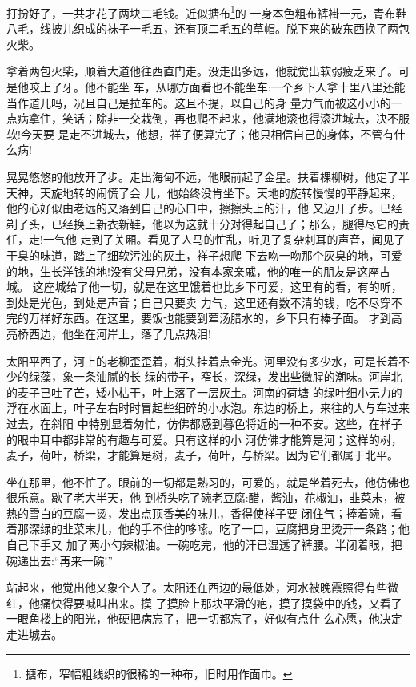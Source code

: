 \documentclass[11pt,a4paper,onecolumn]{article}
\begin{document}
打扮好了，一共才花了两块二毛钱。近似搪布\footnote{搪布，窄幅粗线织的很稀的一种布，旧时用作面巾。}的
一身本色粗布裤褂一元，青布鞋八毛，线披儿织成的袜子一毛五，还有顶二毛五的草帽。脱下来的破东西换了两包
火柴。

拿着两包火柴，顺着大道他往西直门走。没走出多远，他就觉出软弱疲乏来了。可是他咬上了牙。他不能坐
车，从哪方面看也不能坐车:一个乡下人拿十里八里还能当作道儿吗，况且自己是拉车的。这且不提，以自己的身
量力气而被这小小的一点病拿住，笑话；除非一交栽倒，再也爬不起来，他满地滚也得滚进城去，决不服软!今天要
是走不进城去，他想，祥子便算完了；他只相信自己的身体，不管有什么病!

晃晃悠悠的他放开了步。走出海甸不远，他眼前起了金星。扶着棵柳树，他定了半天神，天旋地转的闹慌了会
儿，他始终没肯坐下。天地的旋转慢慢的平静起来，他的心好似由老远的又落到自己的心口中，擦擦头上的汗，他
又迈开了步。已经剃了头，已经换上新衣新鞋，他以为这就十分对得起自己了；那么，腿得尽它的责任，走!一气他
走到了关厢。看见了人马的忙乱，听见了复杂刺耳的声音，闻见了干臭的味道，踏上了细软污浊的灰土，祥子想爬
下去吻一吻那个灰臭的地，可爱的地，生长洋钱的地!没有父母兄弟，没有本家亲戚，他的唯一的朋友是这座古城。
这座城给了他一切，就是在这里饿着也比乡下可爱，这里有的看，有的听，到处是光色，到处是声音；自己只要卖
力气，这里还有数不清的钱，吃不尽穿不完的万样好东西。在这里，要饭也能要到荤汤腊水的，乡下只有棒子面。
才到高亮桥西边，他坐在河岸上，落了几点热泪!

太阳平西了，河上的老柳歪歪着，梢头挂着点金光。河里没有多少水，可是长着不少的绿藻，象一条油腻的长
绿的带子，窄长，深绿，发出些微腥的潮味。河岸北的麦子已吐了芒，矮小枯干，叶上落了一层灰土。河南的荷塘
的绿叶细小无力的浮在水面上，叶子左右时时冒起些细碎的小水泡。东边的桥上，来往的人与车过来过去，在斜阳
中特别显着匆忙，仿佛都感到暮色将近的一种不安。这些，在祥子的眼中耳中都非常的有趣与可爱。只有这样的小
河仿佛才能算是河；这样的树，麦子，荷叶，桥梁，才能算是树，麦子，荷叶，与桥梁。因为它们都属于北平。

坐在那里，他不忙了。眼前的一切都是熟习的，可爱的，就是坐着死去，他仿佛也很乐意。歇了老大半天，他
到桥头吃了碗老豆腐:醋，酱油，花椒油，韭菜末，被热的雪白的豆腐一烫，发出点顶香美的味儿，香得使祥子要
闭住气；捧着碗，看着那深绿的韭菜末儿，他的手不住的哆嗦。吃了一口，豆腐把身里烫开一条路；他自己下手又
加了两小勺辣椒油。一碗吃完，他的汗已湿透了裤腰。半闭着眼，把碗递出去:``再来一碗!''

站起来，他觉出他又象个人了。太阳还在西边的最低处，河水被晚霞照得有些微红，他痛快得要喊叫出来。摸
了摸脸上那块平滑的疤，摸了摸袋中的钱，又看了一眼角楼上的阳光，他硬把病忘了，把一切都忘了，好似有点什
么心愿，他决定走进城去。
\end{document}
